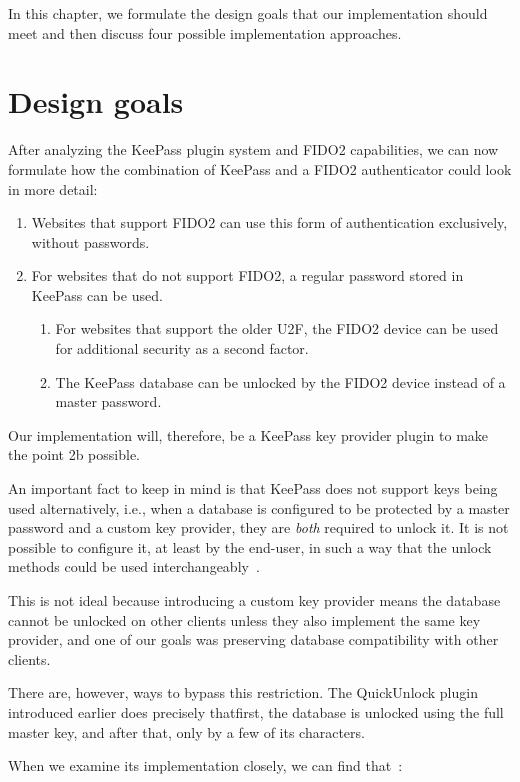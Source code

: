 In this chapter, we formulate the design goals that our implementation should meet
and then discuss four possible implementation approaches.

\section{Design goals}\label{sec:design-goals}
After analyzing the KeePass plugin system and FIDO2 capabilities, we can now formulate how the combination of KeePass
and a FIDO2 authenticator could look in more detail:

\begin{enumerate}
	\item Websites that support FIDO2 can use this form of authentication exclusively, without passwords.
	\item For websites that do not support FIDO2, a regular password stored in KeePass can be used.
	\begin{enumerate}
		\item For websites that support the older U2F, the FIDO2 device can be used for additional security as a second factor.
		\item The KeePass database can be unlocked by the FIDO2 device instead of a master password.
	\end{enumerate}
\end{enumerate}

Our implementation will, therefore, be a KeePass key provider plugin to make the point 2b possible.

An important fact to keep in mind is that KeePass does not support keys being used alternatively,
i.e., when a database is configured to be protected by a master password and a custom key provider,
they are \emph{both} required to unlock it. It is not possible to configure it, at least by the end-user, in such a way
that the unlock methods could be used interchangeably~\cite{keepass:keys}.

This is not ideal because introducing a custom key provider means the database cannot be unlocked
on other clients unless they also implement the same key provider, and one of our goals was preserving
database compatibility with other clients.

There are, however, ways to bypass this restriction. The QuickUnlock plugin introduced earlier does precisely
that\textemdash first, the database is unlocked using the full master key, and after that, only by a few of its characters.

When we examine its implementation closely, we can find that~\cite{keepass:plugin:quick-unlock}:

